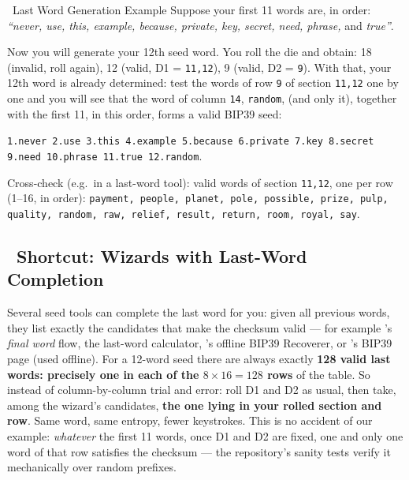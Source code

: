 \documentclass[10pt]{article}
\begin{document}
\begin{examplebox}{\faLightbulb~Last Word Generation Example}
Suppose your first 11 words are, in order: \textit{``never, use, this, example, because, private, key, secret, need, phrase,} and \textit{true''}.

Now you will generate your 12th seed word. You roll the die and obtain: 18 (invalid, roll again), 12 (valid, D1 = \texttt{11,12}), 9 (valid, D2 = \texttt{9}). With that, your 12th word is already determined: test the words of row \texttt{9} of section \texttt{11,12} one by one and you will see that the word of column \texttt{14}, \texttt{random}, (and only it), together with the first 11, in this order, forms a valid BIP39 seed:

\vspace{0.5em}
\texttt{1.never 2.use 3.this 4.example 5.because 6.private 7.key 8.secret 9.need 10.phrase 11.true 12.random}. \faCheckCircle
\vspace{0.25em}

{\scriptsize Cross-check (e.g.\ in a last-word tool): valid words of section \texttt{11,12}, one per row (1--16, in order): \texttt{payment, people, planet, pole, possible, prize, pulp, quality, random, raw, relief, result, return, room, royal, say}.\par}
\end{examplebox}

\subsection*{\faMagic~Shortcut: Wizards with Last-Word Completion}

Several seed tools can complete the last word for you: given all previous words, they list exactly the candidates that make the checksum valid --- for example \seedsignerlink's \textit{final word} flow, the \seedpickerlink{} last-word calculator, \coinplatelink's offline BIP39 Recoverer, or \iancolemanlink's BIP39 page (used offline). For a 12-word seed there are always exactly \textbf{128 valid last words: precisely one in each of the $8\times16=128$ rows} of the table. So instead of column-by-column trial and error: roll D1 and D2 as usual, then take, among the wizard's candidates, \textbf{the one lying in your rolled section and row}. Same word, same entropy, fewer keystrokes. This is no accident of our example: \emph{whatever} the first 11 words, once D1 and D2 are fixed, one and only one word of that row satisfies the checksum --- the repository's sanity tests verify it mechanically over random prefixes.
\end{document}
